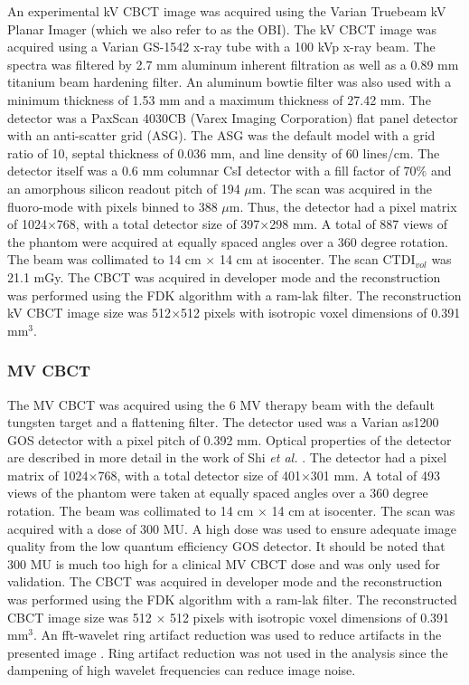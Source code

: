 An experimental kV CBCT image was acquired using the Varian Truebeam kV Planar Imager (which we also refer to as the OBI). The kV CBCT image was acquired using a Varian GS-1542 x-ray tube with a 100 kVp x-ray beam. The spectra was filtered by 2.7 mm aluminum inherent filtration as well as a 0.89 mm titanium beam hardening filter. An aluminum bowtie filter was also used with a minimum thickness of 1.53 mm and a maximum thickness of 27.42 mm. The detector was a PaxScan 4030CB (Varex Imaging Corporation) flat panel detector with an anti-scatter grid (ASG). The ASG was the default model with a grid ratio of 10, septal thickness of 0.036 mm, and line density of 60 lines/cm. The detector itself was a 0.6 mm columnar CsI detector with a fill factor of 70\% and an amorphous silicon readout pitch of 194 $\mu$m. The scan was acquired in the fluoro-mode with pixels binned to 388 $\mu$m. Thus, the detector had a pixel matrix of 1024$\times$768, with a total detector size of 397$\times$298 mm. A total of 887 views of the phantom were acquired at equally spaced angles over a 360 degree rotation. The beam was collimated to 14 cm $\times$ 14 cm at isocenter. The scan CTDI$_{vol}$ was 21.1 mGy. The CBCT was acquired in developer mode and the reconstruction was performed using the FDK algorithm \cite{Feldkamp1984PracticalAlgorithm} with a ram-lak filter. The reconstruction kV CBCT image size was 512$\times$512 pixels with isotropic voxel dimensions of 0.391 mm$^3$.

\subsubsection{MV CBCT}

The MV CBCT was acquired using the 6 MV therapy beam with the default tungsten target and a flattening filter. The detector used was a Varian as1200 GOS detector with a pixel pitch of 0.392 mm. Optical properties of the detector are described in more detail in the work of Shi \textit{et al.} \cite{Shi2018APerformance}. The detector had a pixel matrix of 1024$\times$768, with a total detector size of 401$\times$301 mm. A total of 493 views of the phantom were taken at equally spaced angles over a 360 degree rotation. The beam was collimated to 14 cm $\times$ 14 cm at isocenter. The scan was acquired with a dose of 300 MU. A high dose was used to ensure adequate image quality from the low quantum efficiency GOS detector. It should be noted that 300 MU is much too high for a clinical MV CBCT dose and was only used for validation. The CBCT was acquired in developer mode and the reconstruction was performed using the FDK algorithm with a ram-lak filter. The reconstructed CBCT image size was 512 $\times$ 512 pixels with isotropic voxel dimensions of 0.391 mm$^3$. An fft-wavelet ring artifact reduction was used to reduce artifacts in the presented image \cite{Munch2009StripeFiltering}. Ring artifact reduction was not used in the analysis since the dampening of high wavelet frequencies can reduce image noise.


